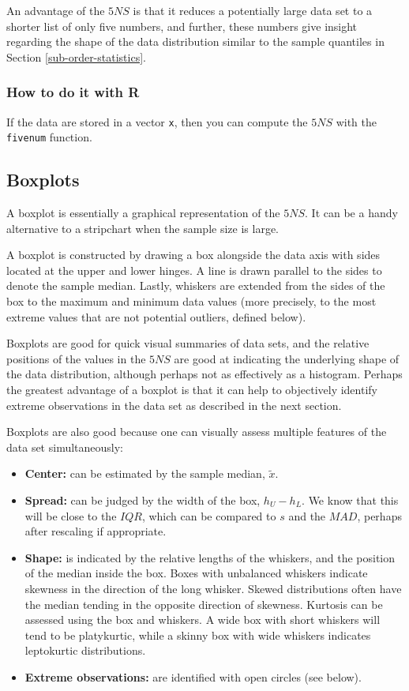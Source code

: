 \documentclass[]{book}
\providecommand{\tightlist}{%
  \setlength{\itemsep}{0pt}\setlength{\parskip}{0pt}}
\numberwithin{equation}{chapter}
\numberwithin{figure}{chapter}
\theoremstyle{plain}
\theoremstyle{definition}
\theoremstyle{remark}
\theoremstyle{definition}
\theoremstyle{definition}
\theoremstyle{remark}
\begin{document}
An advantage of the \(5NS\) is that it reduces a potentially large data
set to a shorter list of only five numbers, and further, these numbers
give insight regarding the shape of the data distribution similar to the
sample quantiles in Section \ref{sub-order-statistics}.

\subsubsection{How to do it with R}\label{how-to-do-it-with-r-5}

If the data are stored in a vector \texttt{x}, then you can compute the
\(5NS\) with the \texttt{fivenum} function.

\subsection{Boxplots}\label{sub-boxplots}

A boxplot is essentially a graphical representation of the \(5NS\). It
can be a handy alternative to a stripchart when the sample size is
large.

A boxplot is constructed by drawing a box alongside the data axis with
sides located at the upper and lower hinges. A line is drawn parallel to
the sides to denote the sample median. Lastly, whiskers are extended
from the sides of the box to the maximum and minimum data values (more
precisely, to the most extreme values that are not potential outliers,
defined below).

Boxplots are good for quick visual summaries of data sets, and the
relative positions of the values in the \(5NS\) are good at indicating
the underlying shape of the data distribution, although perhaps not as
effectively as a histogram. Perhaps the greatest advantage of a boxplot
is that it can help to objectively identify extreme observations in the
data set as described in the next section.

Boxplots are also good because one can visually assess multiple features
of the data set simultaneously:

\begin{itemize}
\tightlist
\item
  \textbf{Center:} can be estimated by the sample median, \(\tilde{x}\).
\item
  \textbf{Spread:} can be judged by the width of the box,
  \(h_{U}-h_{L}\). We know that this will be close to the \(IQR\), which
  can be compared to \(s\) and the \(MAD\), perhaps after rescaling if
  appropriate.
\item
  \textbf{Shape:} is indicated by the relative lengths of the whiskers,
  and the position of the median inside the box. Boxes with unbalanced
  whiskers indicate skewness in the direction of the long whisker.
  Skewed distributions often have the median tending in the opposite
  direction of skewness. Kurtosis can be assessed using the box and
  whiskers. A wide box with short whiskers will tend to be platykurtic,
  while a skinny box with wide whiskers indicates leptokurtic
  distributions.
\item
  \textbf{Extreme observations:} are identified with open circles (see
  below).
\end{itemize}
\end{document}
